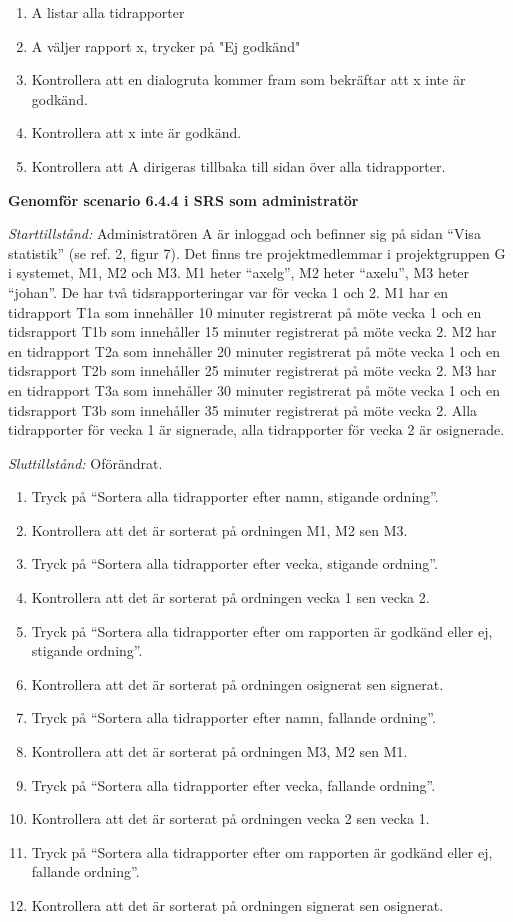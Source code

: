 \documentclass[a4paper]{article}
\begin{document}
\begin{ST}
\begin{enumerate}
\item A listar alla tidrapporter
\item A väljer rapport x, trycker på "Ej godkänd"
\item Kontrollera att en dialogruta kommer fram som bekräftar att x inte är godkänd.
\item Kontrollera att x inte är godkänd.
\item Kontrollera att A dirigeras tillbaka till sidan över alla tidrapporter.
\end{enumerate}

\item
\textbf{Genomför scenario 6.4.4 i SRS som administratör}

\emph{Starttillstånd:} Administratören A är inloggad och befinner sig på sidan ``Visa statistik'' (se ref. 2, figur 7). Det finns tre projektmedlemmar i projektgruppen G i systemet, M1, M2 och M3. M1 heter ``axelg'', M2 heter ``axelu'', M3 heter ``johan''. De har två tidsrapporteringar var för vecka 1 och 2. M1 har en tidrapport T1a som innehåller 10 minuter registrerat på möte vecka 1 och en tidsrapport T1b som innehåller 15 minuter registrerat på möte vecka 2. M2 har en tidrapport T2a som innehåller 20 minuter registrerat på möte vecka 1 och en tidsrapport T2b som innehåller 25 minuter registrerat på möte vecka 2. M3 har en tidrapport T3a som innehåller 30 minuter registrerat på möte vecka 1 och en tidsrapport T3b som innehåller 35 minuter registrerat på möte vecka 2. Alla tidrapporter för vecka 1 är signerade, alla tidrapporter för vecka 2 är osignerade.

\emph{Sluttillstånd:} Oförändrat.

\begin{enumerate}
\item Tryck på ``Sortera alla tidrapporter efter namn, stigande ordning''.
\item Kontrollera att det är sorterat på ordningen M1, M2 sen M3.
\item Tryck på ``Sortera alla tidrapporter efter vecka, stigande ordning''.
\item Kontrollera att det är sorterat på ordningen vecka 1 sen vecka 2.
\item Tryck på ``Sortera alla tidrapporter efter om rapporten är godkänd eller ej, stigande ordning''.
\item Kontrollera att det är sorterat på ordningen osignerat sen signerat.
\item Tryck på ``Sortera alla tidrapporter efter namn, fallande ordning''.
\item Kontrollera att det är sorterat på ordningen M3, M2 sen M1.
\item Tryck på ``Sortera alla tidrapporter efter vecka, fallande ordning''.
\item Kontrollera att det är sorterat på ordningen vecka 2 sen vecka 1.
\item Tryck på ``Sortera alla tidrapporter efter om rapporten är godkänd eller ej, fallande ordning''.
\item Kontrollera att det är sorterat på ordningen signerat sen osignerat.
\end{enumerate}


\end{ST}
\end{document}
